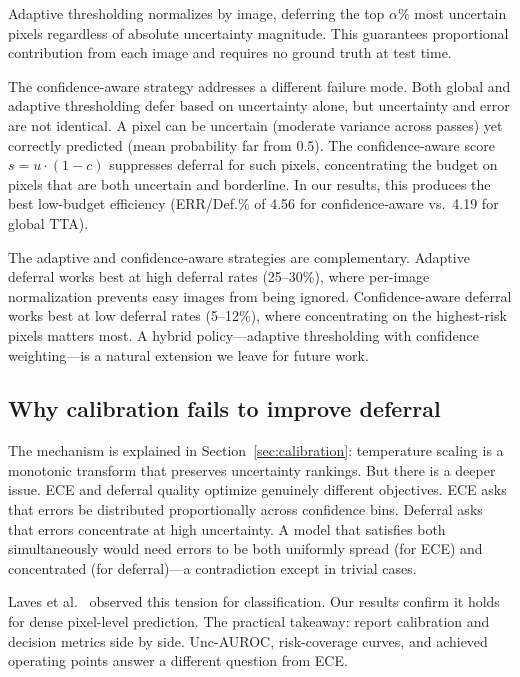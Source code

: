 Adaptive thresholding normalizes by image, deferring the top $\alpha$\%
most uncertain pixels regardless of absolute uncertainty magnitude. This
guarantees proportional contribution from each image and requires no
ground truth at test time.

The confidence-aware strategy addresses a different failure mode. Both global
and adaptive thresholding defer based on uncertainty alone, but uncertainty
and error are not identical. A pixel can be uncertain (moderate variance
across passes) yet correctly predicted (mean probability far from 0.5). The
confidence-aware score $s = u \cdot (1 - c)$ suppresses deferral for such
pixels, concentrating the budget on pixels that are both uncertain and
borderline. In our results, this produces the best low-budget efficiency
(ERR/Def.\% of 4.56 for confidence-aware vs.\ 4.19 for global TTA).

The adaptive and confidence-aware strategies are complementary. Adaptive
deferral works best at high deferral rates (25--30\%), where per-image
normalization prevents easy images from being ignored. Confidence-aware
deferral works best at low deferral rates (5--12\%), where concentrating
on the highest-risk pixels matters most. A hybrid policy---adaptive
thresholding with confidence weighting---is a natural extension we leave
for future work.

\subsection{Why calibration fails to improve deferral}

The mechanism is explained in Section~\ref{sec:calibration}: temperature
scaling is a monotonic transform that preserves uncertainty rankings. But
there is a deeper issue. ECE and deferral quality optimize genuinely
different objectives. ECE asks that errors be distributed proportionally
across confidence bins. Deferral asks that errors concentrate at high
uncertainty. A model that satisfies both simultaneously would need errors
to be both uniformly spread (for ECE) and concentrated (for deferral)---a
contradiction except in trivial cases.

Laves et al.\ \citep{laves2020well} observed this tension for classification.
Our results confirm it holds for dense pixel-level prediction. The practical
takeaway: report calibration and decision metrics side by side. Unc-AUROC,
risk-coverage curves, and achieved operating points answer a different
question from ECE.

